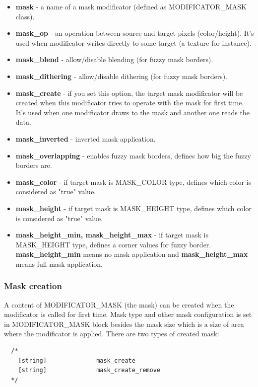 \documentclass[9pt]{article}
\begin{document}
\begin{itemize}
\item{\bf mask} - a name of a mask modificator (defined as MODIFICATOR\_MASK class).
\item{\bf mask\_op} - an operation between source and target pixels (color/height). 
It's used when modificator writes directly to some target (a texture for instance).
\item{\bf mask\_blend} - allow/disable blending (for fuzzy mask borders).
\item{\bf mask\_dithering} - allow/disable dithering (for fuzzy mask borders).
\item{\bf mask\_create} - if you set this option, the target mask modificator will be created
when this modificator tries to operate with the mask for first time. It's used when one 
modificator draws to the mask and another one reads the data.
\item{\bf mask\_inverted} - inverted mask application.
\item{\bf mask\_overlapping} - enables fuzzy mask borders, defines how big the fuzzy
borders are.
\item{\bf mask\_color} - if target mask is MASK\_COLOR type, defines which color
is considered as "true" value.
\item{\bf mask\_height} - if target mask is MASK\_HEIGHT type, defines which color
is considered as "true" value.
\item{\bf mask\_height\_min, mask\_height\_max} - if target mask is MASK\_HEIGHT type,
defines a corner values for fuzzy border. {\bf mask\_height\_min} means no mask application
and {\bf mask\_height\_max} means full mask application.
\end{itemize}

\subsubsection{Mask creation}

A content of MODIFICATOR\_MASK (the mask) can be created when 
the modificator is called for first time. Mask type and other mask configuration
is set in MODIFICATOR\_MASK block besides the mask size which is a size 
of area where the modificator is applied. There are two types of created mask:

\begin{verbatim}
  /*
    [string]              mask_create
    [string]              mask_create_remove
  */
\end{verbatim}
\end{document}
